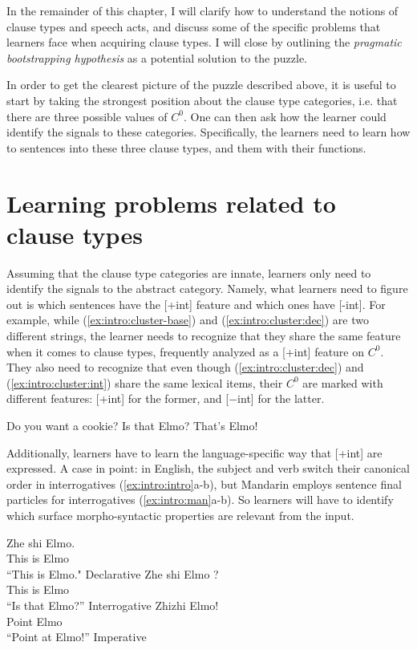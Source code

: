 {In the remainder of this chapter, I will clarify how to understand the notions of clause types and speech acts, and discuss some of the specific problems that learners face when acquiring clause types. I will close by outlining the \emph{pragmatic bootstrapping hypothesis} as a potential solution to the puzzle.

In order to get the clearest picture of the puzzle described above, it is useful to start by taking the strongest position about the clause type categories, i.e. that there are three possible values of $C^{0}$. One can then ask how the learner could identify the signals to these categories. Specifically, the learners need to learn how to  sentences into these three clause types, and  them with their functions. 


\section{Learning problems related to clause types}


Assuming that the clause type categories are innate, learners only need to identify the signals to the abstract category. Namely, what learners need to figure out is which sentences have the [+int] feature and which ones have [-int]. 
For example, while (\ref{ex:intro:cluster-base}) and (\ref{ex:intro:cluster:dec}) are two different strings, the learner needs to recognize that they share the same feature when it comes to clause types, frequently analyzed as a [+int] feature on $C^{0}$. They also need to recognize that even though (\ref{ex:intro:cluster:dec}) and (\ref{ex:intro:cluster:int}) share the same lexical items, their $C^{0}$ are marked with different features: [+int] for the former, and [$-$int] for the latter.


Do you want a cookie?
\eex
{}
\bxl\label{ex:intro:cluster:int}
Is that Elmo?
\ex\label{ex:intro:cluster:dec}
That’s Elmo!
\exl
\eex


Additionally, learners have to learn the language-specific way that [+int] are expressed. A case in point: in English, the subject and verb switch their canonical order in interrogatives (\ref{ex:intro:intro}a-b), but Mandarin employs sentence final particles for interrogatives (\ref{ex:intro:man}a-b). So learners will have to identify which surface morpho-syntactic properties are relevant from the input.  


\bxl
\gll Zhe shi Elmo.\\
This is Elmo\\
\trans ``This is Elmo." \hfill Declarative
\ex 
\gll Zhe shi Elmo ?\\
This is Elmo \Sfp\\
\trans ``Is that Elmo?'' \hfill Interrogative
\ex 
\gll Zhizhi Elmo!\\
Point Elmo\\
\trans ``Point at Elmo!'' \hfill Imperative
\exl
\eex


}
